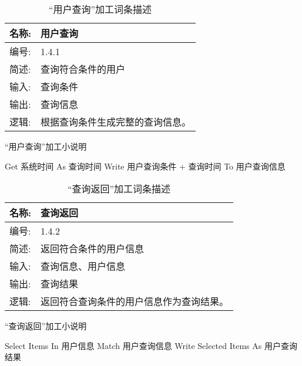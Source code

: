 \begin{table}[H]  
\caption{“用户查询”加工词条描述}  
\begin{center}  
    \begin{tabular}{l p{11cm}} 
        \hline
        \quad 名称:  &   用户查询 \\
        \hline
        \quad 编号:  & 1.4.1 \\
        \hline
        \quad 简述:  & 查询符合条件的用户 \\
        \hline
        \quad 输入:  & 查询条件 \\
        \hline
        \quad 输出:  & 查询信息\\
        \hline
        \quad 逻辑:  & 根据查询条件生成完整的查询信息。 \\
        \hline
    \end{tabular}
    \label{tab1}
\end{center}
\end{table}

\begin{algorithm}[H] 
    \renewcommand{\thealgorithm}{}
    \caption{“用户查询”加工小说明} 
    \label{alg3} 
    \begin{algorithmic}[1]
        \STATE Get 系统时间 As 查询时间
        \STATE Write 用户查询条件 + 查询时间 To 用户查询信息 
    \end{algorithmic} 
\end{algorithm}

\begin{table}[H]  
\caption{“查询返回”加工词条描述}  
\begin{center}  
    \begin{tabular}{l p{11cm}} 
        \hline
        \quad 名称:  &   查询返回 \\
        \hline
        \quad 编号:  & 1.4.2 \\
        \hline
        \quad 简述:  & 返回符合条件的用户信息 \\
        \hline
        \quad 输入:  & 查询信息、用户信息 \\
        \hline
        \quad 输出:  & 查询结果\\
        \hline
        \quad 逻辑:  & 返回符合查询条件的用户信息作为查询结果。 \\
        \hline
    \end{tabular}
    \label{tab1}
\end{center}
\end{table}

\begin{algorithm}[H] 
    \renewcommand{\thealgorithm}{}
    \caption{“查询返回”加工小说明} 
    \label{alg3} 
    \begin{algorithmic}[1]
        \STATE Select Items In 用户信息 Match 用户查询信息
        \STATE Write Selected Items As 用户查询结果
    \end{algorithmic} 
\end{algorithm}

